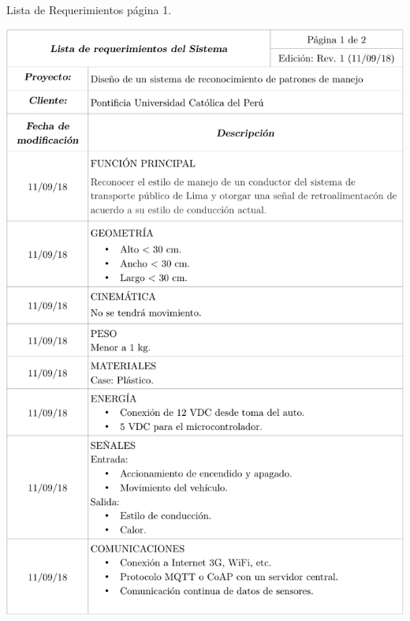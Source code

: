 \begin{table}[htbp!]
  \caption{Lista de Requerimientos página 1.}
  \label{diag:3.1}
  \includegraphics[width=1.05\linewidth]{Tab1.pdf}
\end{table}


